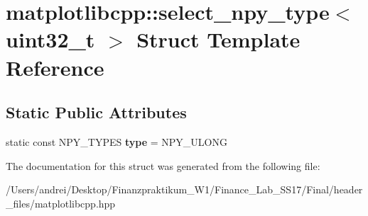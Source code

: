 \hypertarget{structmatplotlibcpp_1_1select__npy__type_3_01uint32__t_01_4}{}\section{matplotlibcpp\+:\+:select\+\_\+npy\+\_\+type$<$ uint32\+\_\+t $>$ Struct Template Reference}
\label{structmatplotlibcpp_1_1select__npy__type_3_01uint32__t_01_4}
\subsection*{Static Public Attributes}
\begin{DoxyCompactItemize}
\item 
\mbox{\label{structmatplotlibcpp_1_1select__npy__type_3_01uint32__t_01_4_a21b0fbd17b661ef512cc1c3c728dfa60}} 
static const N\+P\+Y\+\_\+\+T\+Y\+P\+ES {\bfseries type} = N\+P\+Y\+\_\+\+U\+L\+O\+NG
\end{DoxyCompactItemize}


The documentation for this struct was generated from the following file\+:\begin{DoxyCompactItemize}
\item 
/\+Users/andrei/\+Desktop/\+Finanzpraktikum\+\_\+\+W1/\+Finance\+\_\+\+Lab\+\_\+\+S\+S17/\+Final/header\+\_\+files/matplotlibcpp.\+hpp\end{DoxyCompactItemize}
